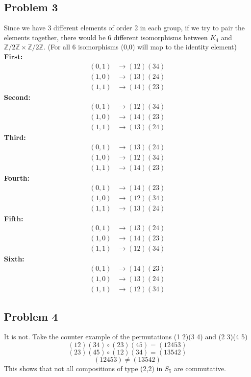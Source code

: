 \documentclass[12pt]{article}
\newcommand{\Z}{\mathbb{Z}}
\begin{document}
\subsection*{Problem 3}
Since we have 3 different elements of order 2 in each group, if we try to pair the elements together, there would be 6 different isomorphisms between $K_4$ and $\Z/2\Z \times \Z/2\Z$. (For all 6 isomorphisms (0,0) will map to the identity element)\\
\textbf{First:}
\begin{align*}
(0,1) &\rightarrow (12)(34)\\
(1,0) &\rightarrow (13)(24)\\
(1,1) &\rightarrow (14)(23)
\end{align*}
\textbf{Second:}
\begin{align*}
(0,1) &\rightarrow (12)(34)\\
(1,0) &\rightarrow (14)(23)\\
(1,1) &\rightarrow (13)(24)
\end{align*}
\textbf{Third:}
\begin{align*}
(0,1) &\rightarrow (13)(24)\\
(1,0) &\rightarrow (12)(34)\\
(1,1) &\rightarrow (14)(23)
\end{align*}
\textbf{Fourth:}
\begin{align*}
(0,1) &\rightarrow (14)(23)\\
(1,0) &\rightarrow (12)(34)\\
(1,1) &\rightarrow (13)(24)
\end{align*}
\textbf{Fifth:}
\begin{align*}
(0,1) &\rightarrow (13)(24)\\
(1,0) &\rightarrow (14)(23)\\
(1,1) &\rightarrow (12)(34)
\end{align*}
\textbf{Sixth:}
\begin{align*}
(0,1) &\rightarrow (14)(23)\\
(1,0) &\rightarrow (13)(24)\\
(1,1) &\rightarrow (12)(34)
\end{align*}
\newpage
\subsection*{Problem 4}
It is not. Take the counter example of the permutations (1 2)(3 4) and (2 3)(4 5)
\[ (1 2)(3 4) \circ (2 3)(4 5) = (1 2 4 5 3) \]
\[ (2 3)(4 5) \circ (1 2)(3 4) = (1 3 5 4 2) \]
\[ (1 2 4 5 3) \neq (1 3 5 4 2) \]
This shows that not all compositions of type (2,2) in $S_5$ are commutative.
\end{document}
